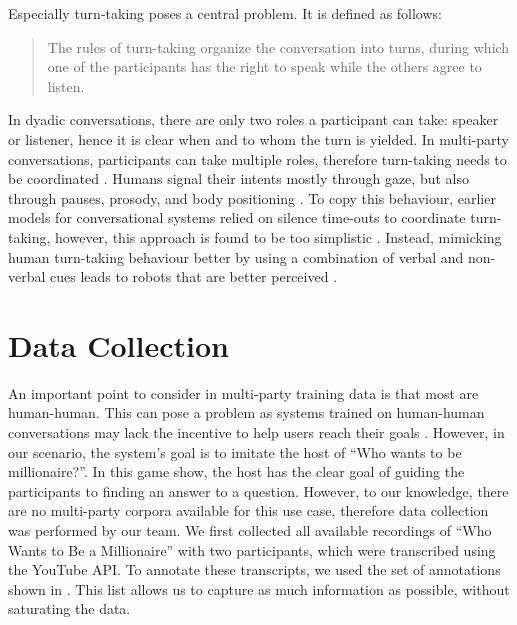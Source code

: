 \documentclass[hidelinks, 11pt]{article}
\begin{document}
Especially turn-taking poses a central problem. It is defined as follows:

\begin{quote}
  The rules of turn-taking organize the conversation into turns, during which one of the participants has the right to speak while the others agree to listen. \cite{Żarkowski_2019}
\end{quote}

In dyadic conversations, there are only two roles a participant can take: speaker or listener, hence it is clear when and to whom the turn is yielded. In multi-party conversations, participants can take multiple roles, therefore turn-taking needs to be coordinated \cite{Johansson_Skantze_2015}. Humans signal their intents mostly through gaze, but also through pauses, prosody, and body positioning \cite{Żarkowski_2019}. To copy this behaviour, earlier models for conversational systems relied on silence time-outs to coordinate turn-taking, however, this approach is found to be too simplistic \cite{skantze_turn_taking_2021}. Instead, mimicking human turn-taking behaviour better by using a combination of verbal and non-verbal cues leads to robots that are better perceived \cite{moujahid_multi_party_2022}.

\section{Data Collection}
\label{sec:data_collection}

An important point to consider in multi-party training data is that most are human-human. This can pose a problem as systems trained on human-human conversations may lack the incentive to help users reach their goals \cite{Addlesee_Data_2023}. However, in our scenario, the system's goal is to imitate the host of ``Who wants to be millionaire?''. In this game show, the host has the clear goal of guiding the participants to finding an answer to a question. However, to our knowledge, there are no multi-party corpora available for this use case, therefore data collection was performed by our team. We first collected all available recordings of ``Who Wants to Be a Millionaire'' with two participants, which were transcribed using the YouTube API. To annotate these transcripts, we used the set of annotations shown in . This list allows us to capture as much information as possible, without saturating the data.
\end{document}
